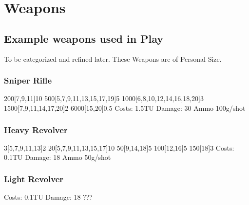 \section{Weapons}\label{sec:weapons}
\subsection{Example weapons used in Play}\label{subsec:example-weapons-used-in-play}
To be categorized and refined later.
These Weapons are of Personal Size.
\subsubsection{Sniper Rifle}
200[7,9,11]10
500[5,7,9,11,13,15,17,19]5
1000[6,8,10,12,14,16,18,20]3
1500[7,9,11,14,17,20]2
6000[15,20]0.5
Costs: 1.5TU
Damage: 30
Ammo 100g/shot

\subsubsection{Heavy Revolver}
3[5,7,9,11,13]2
20[5,7,9,11,13,15,17]10
50[9,14,18]5
100[12,16]5
150[18]3
Costs: 0.1TU
Damage: 18
Ammo 50g/shot

\subsubsection{Light Revolver}
Costs: 0.1TU
Damage: 18
???

